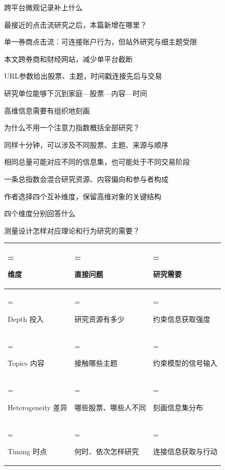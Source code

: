 \documentclass[11pt,compress]{beamer}
\begin{document}
\begin{frame}{跨平台微观记录补上什么}\relax
{\small\color{tsinghua}最接近的点击流研究之后，本篇新增在哪里？\par}\medskip
单一券商点击流：可连接账户行为，但站外研究与细主题受限\par\medskip
本文跨券商和财经网站，减少单平台截断\par\medskip
URL参数给出股票、主题，时间戳连接先后与交易\par\medskip
研究单位能够下沉到家庭—股票—内容—时间\par\medskip
{}
\end{frame}
\begin{frame}{高维信息需要有组织地刻画}\relax
{\small\color{tsinghua}为什么不用一个注意力指数概括全部研究？\par}\medskip
同样十分钟，可以涉及不同股票、主题、来源与顺序\par\medskip
相同总量可能对应不同的信息集，也可能处于不同交易阶段\par\medskip
一条总指数会混合研究资源、内容偏向和参与者构成\par\medskip
作者选择四个互补维度，保留高维对象的关键结构\par\medskip
{}
\end{frame}
\begin{frame}{四个维度分别回答什么}\relax
{\small\color{tsinghua}测量设计怎样对应理论和行为研究的需要？\par}\medskip
{\small\renewcommand{\arraystretch}{1.12}
\begin{tabularx}{\linewidth}{@{}>{\hsize=1.680\hsize\linewidth=\hsize\raggedright\arraybackslash}X>{\hsize=0.660\hsize\linewidth=\hsize\raggedright\arraybackslash}X>{\hsize=0.660\hsize\linewidth=\hsize\raggedright\arraybackslash}X@{}}\toprule
\textbf{维度} & \textbf{直接问题} & \textbf{研究需要}\\
\midrule
Depth 投入 & 研究资源有多少 & 约束信息获取强度\\
Topics 内容 & 接触哪些主题 & 约束模型的信号输入\\
Heterogeneity 差异 & 哪些股票、哪些人不同 & 刻画信息集分布\\
Timing 时点 & 何时、依次怎样研究 & 连接信息获取与行动\\
\bottomrule\end{tabularx}}
\medskip
{}
\end{frame}
\end{document}
